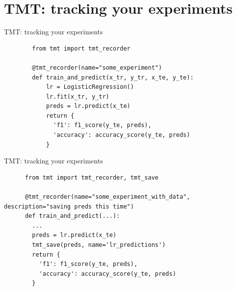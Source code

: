 \documentclass[aspectratio=169,xcolor={dvipsnames}]{beamer}
\begin{document}
  \section{TMT: tracking your experiments}
  \begin{frame}[fragile]{TMT: tracking your experiments}
      \begin{verbatim}
        from tmt import tmt_recorder

        @tmt_recorder(name="some_experiment")
        def train_and_predict(x_tr, y_tr, x_te, y_te):
            lr = LogisticRegression()
            lr.fit(x_tr, y_tr)
            preds = lr.predict(x_te)
            return {
              'f1': f1_score(y_te, preds), 
              'accuracy': accuracy_score(y_te, preds)
            }
      \end{verbatim}
  \end{frame}
  \begin{frame}[fragile]{TMT: tracking your experiments}
    \begin{verbatim}
      from tmt import tmt_recorder, tmt_save

      @tmt_recorder(name="some_experiment_with_data", description="saving preds this time")
      def train_and_predict(...):
        ...
        preds = lr.predict(x_te)
        tmt_save(preds, name='lr_predictions')
        return {
          'f1': f1_score(y_te, preds), 
          'accuracy': accuracy_score(y_te, preds)
        }
    \end{verbatim}
  \end{frame}
\end{document}
